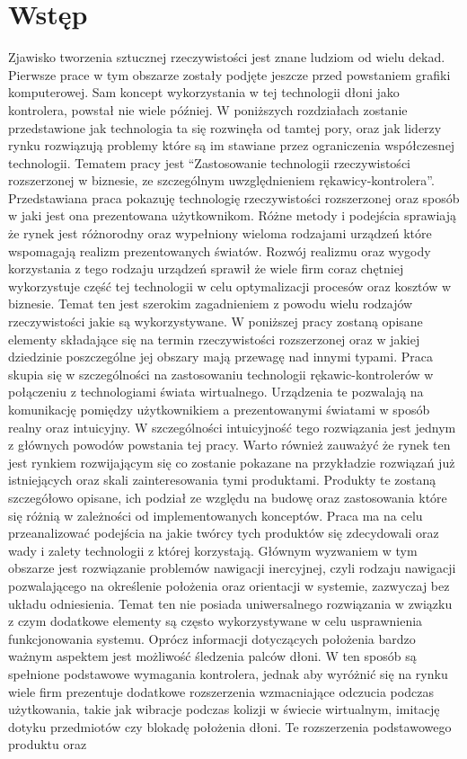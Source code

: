 \chapter{Wstęp}
\label{ch:wstep}
Zjawisko tworzenia sztucznej rzeczywistości jest znane ludziom od wielu dekad. Pierwsze prace w tym obszarze zostały podjęte jeszcze przed powstaniem grafiki komputerowej. Sam koncept wykorzystania w tej technologii dłoni jako kontrolera, powstał nie wiele później. W poniższych rozdziałach zostanie przedstawione jak technologia ta się  rozwinęła od tamtej pory, oraz jak liderzy rynku rozwiązują problemy które są im stawiane przez ograniczenia współczesnej technologii. Tematem pracy jest ``Zastosowanie technologii rzeczywistości rozszerzonej w biznesie, ze szczególnym uwzględnieniem rękawicy-kontrolera''. Przedstawiana praca pokazuję technologię rzeczywistości rozszerzonej oraz sposób w jaki jest ona prezentowana użytkownikom. Różne metody i podejścia sprawiają że rynek jest różnorodny oraz wypełniony wieloma rodzajami urządzeń które wspomagają realizm prezentowanych światów. Rozwój realizmu oraz wygody korzystania z tego rodzaju urządzeń sprawił że wiele firm coraz chętniej wykorzystuje część tej technologii w celu optymalizacji procesów oraz kosztów w biznesie. Temat ten jest szerokim zagadnieniem z powodu wielu rodzajów rzeczywistości jakie są wykorzystywane. W poniższej pracy zostaną opisane elementy składające się na termin rzeczywistości rozszerzonej oraz w jakiej dziedzinie poszczególne jej obszary mają przewagę nad innymi typami. Praca skupia się w szczególności na zastosowaniu technologii rękawic-kontrolerów w połączeniu z technologiami świata wirtualnego. Urządzenia te pozwalają na komunikację pomiędzy użytkownikiem a prezentowanymi światami w sposób realny oraz intuicyjny. W szczególności intuicyjność tego rozwiązania jest jednym z głównych powodów powstania tej pracy. Warto również zauważyć że rynek ten jest rynkiem rozwijającym się co zostanie pokazane na przykładzie rozwiązań już istniejących oraz skali zainteresowania tymi produktami. Produkty te zostaną szczegółowo opisane, ich podział ze względu na budowę oraz zastosowania które się różnią w zależności od implementowanych konceptów. Praca ma na celu przeanalizować podejścia na jakie twórcy tych produktów się zdecydowali oraz wady i zalety technologii z której korzystają. Głównym wyzwaniem w tym obszarze jest rozwiązanie problemów nawigacji inercyjnej, czyli rodzaju nawigacji pozwalającego na określenie położenia oraz orientacji w systemie, zazwyczaj bez układu odniesienia. Temat ten nie posiada uniwersalnego rozwiązania w związku z czym dodatkowe elementy są często wykorzystywane w celu usprawnienia funkcjonowania systemu. Oprócz informacji dotyczących położenia bardzo ważnym aspektem jest możliwość śledzenia palców dłoni. W ten sposób są spełnione podstawowe wymagania kontrolera, jednak aby wyróżnić się na rynku wiele firm prezentuje dodatkowe rozszerzenia wzmacniające odczucia podczas użytkowania, takie jak wibracje podczas kolizji w świecie wirtualnym, imitację dotyku przedmiotów czy blokadę położenia dłoni. Te rozszerzenia podstawowego produktu oraz 